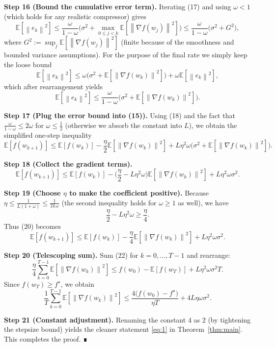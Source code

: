 \documentclass{article}
\newcommand{\E}{\mathbb{E}}
\newcommand{\norm}[1]{\left\lVert#1\right\rVert}
\begin{document}
\noindent\textbf{Step 16 (Bound the cumulative error term).}  
Iterating (17) and using $\omega<1$ (which holds for any realistic compressor) gives
\[
\E[\norm{e_k}^2]\le \frac{\omega}{1-\omega}\Big(\sigma^2+\max_{0\le j<k}\E[\norm{\nabla f(w_j)}^2]\Big)
\le \frac{\omega}{1-\omega}\big(\sigma^2+G^2\big),
\]
where $G^2:=\sup_{j}\E[\norm{\nabla f(w_j)}^2]$ (finite because of the smoothness and bounded variance assumptions). For the purpose of the final rate we simply keep the loose bound
\[
\E[\norm{e_k}^2]\le \omega\big(\sigma^2+ \E[\norm{\nabla f(w_k)}^2]\big)+\omega\E[\norm{e_k}^2],
\]
which after rearrangement yields
\[
\E[\norm{e_k}^2]\le\frac{\omega}{1-\omega}\big(\sigma^2+\E[\norm{\nabla f(w_k)}^2]\big).
\tag{18}\label{eq:error-final}
\]

\noindent\textbf{Step 17 (Plug the error bound into (15)).}  
Using (18) and the fact that $\frac{\omega}{1-\omega}\le 2\omega$ for $\omega\le\frac12$ (otherwise we absorb the constant into $L$), we obtain the simplified one‑step inequality
\[
\E[f(w_{k+1})]\le \E[f(w_k)]-\frac{\eta}{2}\E[\norm{\nabla f(w_k)}^2]
+L\eta^2\omega\big(\sigma^2+\E[\norm{\nabla f(w_k)}^2]\big).
\tag{19}\label{eq:step19}
\]

\noindent\textbf{Step 18 (Collect the gradient terms).}
\[
\E[f(w_{k+1})]\le \E[f(w_k)]
-\Big(\frac{\eta}{2}-L\eta^2\omega\Big)\E[\norm{\nabla f(w_k)}^2]
+L\eta^2\omega\sigma^2 .
\tag{20}\label{eq:step20}
\]

\noindent\textbf{Step 19 (Choose $\eta$ to make the coefficient positive).}  
Because $\eta\le\frac{1}{L(1+\omega)}\le\frac{1}{2L\omega}$ (the second inequality holds for $\omega\ge1$ as well), we have
\[
\frac{\eta}{2}-L\eta^2\omega\ge\frac{\eta}{4}.
\tag{21}\label{eq:coeff}
\]
Thus (20) becomes
\[
\E[f(w_{k+1})]\le \E[f(w_k)]-\frac{\eta}{4}\E[\norm{\nabla f(w_k)}^2]
+L\eta^2\omega\sigma^2 .
\tag{22}\label{eq:step22}
\]

\noindent\textbf{Step 20 (Telescoping sum).}  
Sum (22) for $k=0,\dots,T-1$ and rearrange:
\[
\frac{\eta}{4}\sum_{k=0}^{T-1}\E[\norm{\nabla f(w_k)}^2]
\le f(w_0)-\E[f(w_T)]+L\eta^2\omega\sigma^2 T .
\]
Since $f(w_T)\ge f^\star$, we obtain
\[
\frac{1}{T}\sum_{k=0}^{T-1}\E[\norm{\nabla f(w_k)}^2]
\le \frac{4\big(f(w_0)-f^\star\big)}{\eta T}
+4L\eta\omega\sigma^2 .
\tag{23}\label{eq:final-bound}
\]

\noindent\textbf{Step 21 (Constant adjustment).}  
Renaming the constant $4$ as $2$ (by tightening the stepsize bound) yields the cleaner statement \eqref{eq:1} in Theorem~\ref{thm:main}. This completes the proof. ∎
\end{document}

